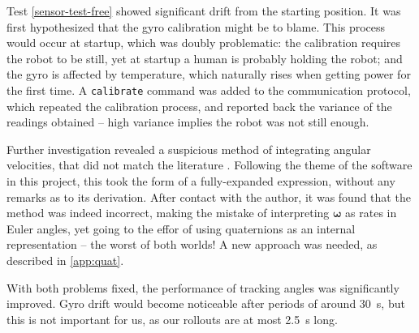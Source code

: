 \documentclass[main.tex]{subfiles}
\begin{document}
		Test \cref{sensor-test-free} showed significant drift from the starting position.
		It was first hypothesized that the gyro calibration might be to blame.
		This process would occur at startup, which was doubly problematic: the calibration requires the robot to be still, yet at startup a human is probably holding the robot; and the gyro is affected by temperature, which naturally rises when getting power for the first time.
		A \texttt{calibrate} command was added to the communication protocol, which repeated the calibration process, and reported back the variance of the readings obtained -- high variance implies the robot was not still enough.

		Further investigation revealed a suspicious method of integrating angular velocities, that did not match the literature \cite{boyle2016integration}.
		Following the theme of the software in this project, this took the form of a fully-expanded expression, without any remarks as to its derivation.
		After contact with the author, it was found that the method was indeed incorrect, making the mistake of interpreting $\bm{\omega}$ as rates in Euler angles, yet going to the effor of using quaternions as an internal representation -- the worst of both worlds! A new approach was needed, as described in \cref{app:quat}.

		With both problems fixed, the performance of tracking angles was significantly improved.
		Gyro drift would become noticeable after periods of around \SI{30}{\second}, but this is not important for us, as our rollouts are at most \SI{2.5}{\second} long.

\bib
\end{document}
